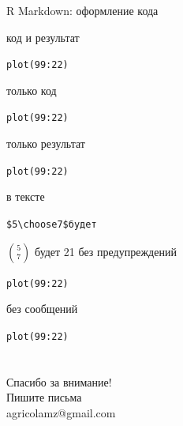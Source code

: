 \begin{frame}[fragile]{R Markdown: оформление кода}
\begin{multicols}{2}
\begin{itemize}
\mytem код и результат
\scriptsize 
\begin{alltt}
{}
plot(99:22)
{\color{red!13!blue}{```}}
\end{alltt}
\normalsize
\mytem только код
\scriptsize 
\begin{alltt}
{}
plot(99:22)
{\color{red!13!blue}{```}}
\end{alltt}
\normalsize
\mytem только результат
\scriptsize 
\begin{alltt}
{}
plot(99:22)
{\color{red!13!blue}{```}}
\end{alltt}
\normalsize
\columnbreak
\mytem в тексте
\tiny 
\begin{alltt}
\$5 \textbackslash choose 7\$ будет {\color{red!13!blue}{`r choose(7, 5)`}}
\end{alltt}
$5 \choose 7$ будет 21
\normalsize
\mytem без предупреждений
\scriptsize 
\begin{alltt}
{}
plot(99:22)
{\color{red!13!blue}{```}}
\end{alltt}
\normalsize
\mytem без сообщений
\scriptsize 
\begin{alltt}
{}
plot(99:22)
{\color{red!13!blue}{```}}
\end{alltt}
\normalsize
\end{itemize}
\end{multicols}
\end{frame}
\section{}
\begin{frame}
{\huge Спасибо за внимание!\bigskip\\
\normalsize Пишите письма\\
agricolamz@gmail.com
\vspace{-130pt}}
\end{frame}
